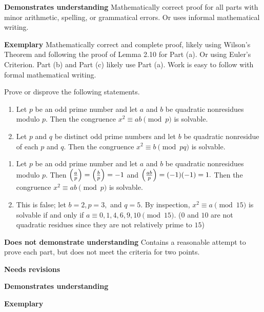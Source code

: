 \documentclass[letterpaper, 11pt]{ximera}
\begin{document}
\begin{ex}
\begin{writeRubric}
    \item \textbf{Demonstrates understanding} Mathematically correct proof for all parts with minor arithmetic, spelling, or grammatical errors. Or uses informal mathematical writing.
    
    \item \textbf{Exemplary} Mathematically correct and complete proof, likely using Wilson's Theorem and following the proof of Lemma 2.10 for Part (a). Or using Euler's Criterion. Part (b) and Part (c) likely use Part (a).  Work is easy to follow with formal mathematical writing.
\end{writeRubric}
\end{ex}

\begin{ex}
	Prove or disprove the following statements.
	 \begin{enumerate}[label=(\alph*)]
		 \item Let $p$ be an odd prime number and let $a$ and $b$ be quadratic nonresidues modulo $p.$ Then the congruence $x^2\equiv ab\pmod{p}$ is solvable.
		 \item Let $p$ and $q$ be distinct odd prime numbers and let $b$ be quadratic nonresidue of each $p$ and $q.$ Then the congruence $x^2\equiv b\pmod{pq}$ is solvable.
	\end{enumerate}

	\begin{solution}
		\begin{enumerate}[label=(\alph*)]
			\item Let $p$ be an odd prime number and let $a$ and $b$ be quadratic nonresidues modulo $p.$ Then $\left(\frac{a}{p}\right)=\left(\frac{b}{p}\right)=-1$ and $\left(\frac{ab}{p}\right)=(-1)(-1)=1.$ Then the congruence $x^2\equiv ab\pmod{p}$ is solvable.
			\item This is false; let $b=2, p=3,$ and $q=5.$ By inspection, $x^2\equiv a\pmod{15}$ is solvable if and only if $a\equiv 0,1,4,6,9,10\pmod{15}$. ($0$ and $10$ are not quadratic residues since they are not relatively prime to $15$)
	   \end{enumerate}
	\end{solution}


\begin{writeRubric}
    \item \textbf{Does not demonstrate understanding}
     Contains a reasonable attempt to prove each part, but does not meet the criteria for two points.
    \item \textbf{Needs revisions}
     
    \item \textbf{Demonstrates understanding}
    
    \item \textbf{Exemplary}
        
\end{writeRubric}

\end{ex}
\end{document}
